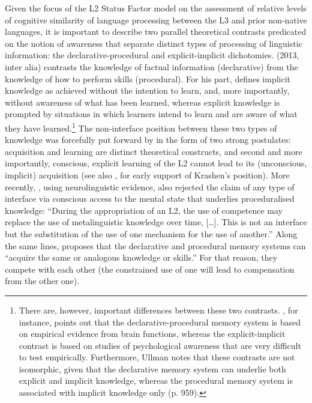 \documentclass[output=paper,modfonts,nonflat,newtxmath]{langsci/langscibook}
\begin{document}
Given the focus of the L2 Status Factor model on the assessment of relative levels of cognitive similarity of language processing between the L3 and prior non-native languages, it is important to describe two parallel theoretical contrasts predicated on the notion of awareness that separate distinct types of processing of linguistic information: the declarative-procedural and explicit-implicit dichotomies. \citeauthor{Anderson2013} (2013, inter alia) contrasts the knowledge of factual information (declarative) from the knowledge of how to perform skills (procedural). For his part, \citet[269]{Williams2005} defines implicit knowledge as achieved without the intention to learn, and, more importantly, without awareness of what has been learned, whereas explicit knowledge is prompted by situations in which learners intend to learn and are aware of what they have learned.\footnote{There are, however, important differences between these two contrasts. \citet{Ullman2016}, for instance, points out that the declarative-procedural memory system is based on empirical evidence from brain functions, whereas the explicit-implicit contrast is based on studies of psychological awareness that are very difficult to test empirically. Furthermore, Ullman notes that these contrasts are not isomorphic, given that the declarative memory system can underlie both explicit and implicit knowledge, whereas the procedural memory system is associated with implicit knowledge only (p. 959).} The non-interface position between these two types of knowledge was forcefully put forward by \citet{Krashen1985} in the form of two strong postulates: acquisition and learning are distinct theoretical constructs, and second and more importantly, conscious, explicit learning of the L2 cannot lead to its (unconscious, implicit) acquisition (see also \citealt{Schwartz1993, AthanasopoulosEtAl2015}, for early support of Krashen’s position). More recently, \citet[63]{Paradis2009}, using neurolinguistic evidence, also rejected the claim of any type of interface via conscious access to the mental state that underlies proceduralised knowledge: “During the appropriation of an L2, the use of competence may replace the use of metalinguistic knowledge over time, […]. This is not an interface but the substitution of the use of one mechanism for the use of another.” Along the same lines, \citet[956--957]{Ullman2016} proposes that the declarative and procedural memory systems can “acquire the same or analogous knowledge or skills.” For that reason, they compete with each other (the constrained use of one will lead to compensation from the other one).
\end{document}
